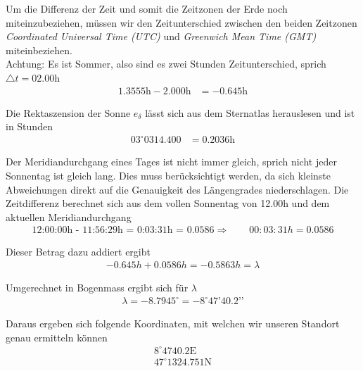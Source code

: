 \begin{refsection}
Um die Differenz der Zeit und somit die Zeitzonen der Erde noch miteinzubeziehen, müssen wir den Zeitunterschied zwischen den beiden Zeitzonen \textit{Coordinated Universal Time (UTC)} und \textit{Greenwich Mean Time (GMT)} miteinbeziehen. \\
Achtung: Es ist Sommer, also sind es zwei Stunden Zeitunterschied, sprich $\triangle{t}=02.00$h
\begin{align*}
1.3555 \text{h} - 2.000 \text{h} &= -0.645 \text{h}
\end{align*}

Die Rektaszension der Sonne $e_\delta$ lässt sich aus dem Sternatlas herauslesen und ist in Stunden
\begin{align*}
03^{\circ} 03 14.400 &= 0.2036 \text{h}
\end{align*}

Der Meridiandurchgang eines Tages ist nicht immer gleich, sprich nicht jeder Sonnentag ist gleich lang. Dies muss berücksichtigt werden, da sich kleinste Abweichungen direkt auf die Genauigkeit des Längengrades niederschlagen.
Die Zeitdifferenz berechnet sich aus dem vollen Sonnentag von 12.00h und dem aktuellen Meridiandurchgang
\begin{align*}
\text{12:00:00h - 11:56:29h = 0:03:31h = 0.0586}
\Rightarrow \quad \quad
00:03:31h = 0.0586
\end{align*}






Dieser Betrag dazu addiert ergibt
\begin{align*}
-0.645 h + 0.0586 h = - 0.5863 h = \lambda
\end{align*}

Umgerechnet in Bogenmass ergibt sich für $\lambda$
\begin{align*}
\lambda = - 8.7945^{\circ} = -8^{\circ} 47’ 40.2’’
\end{align*}



Daraus ergeben sich folgende Koordinaten, mit welchen wir unseren Standort genau ermitteln können
\begin{align*}
8^{\circ}47 40.2 \text{E} \\
47^{\circ}13 24.751 \text{N}
\end{align*}




\printbibliography[heading=subbibliography]
\end{refsection}







